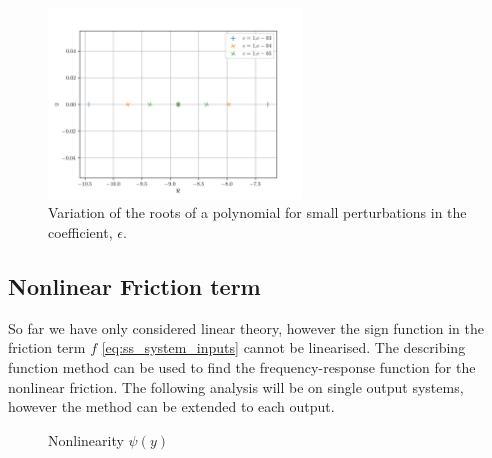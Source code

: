 \documentclass{article}
\begin{document}
\begin{figure}[H]
  \centering
  \includegraphics[width=0.6\textwidth]{figures/pole_sensitivity.png}
  \caption{Variation of the roots of a polynomial for small perturbations in the coefficient, $\epsilon$.}
  \label{fig:pole_sensitivity}
\end{figure}

\subsection{Nonlinear Friction term}
So far we have only considered linear theory, however the sign function in the friction term $f$ \ref{eq:ss_system_inputs} cannot be linearised.
The describing function method can be used to find the frequency-response function for
the nonlinear friction.
The following analysis will be on single output systems, however the method can be extended to each output.

\begin{figure}[H]
  \centering
  \caption{Nonlinearity $\psi(y)$ }
  \label{fig:nonlinear_block_diagram}
\end{figure}
\end{document}
